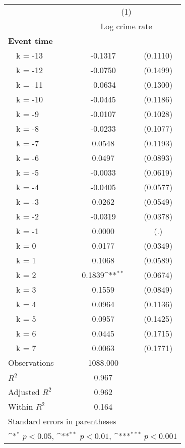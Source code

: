 {
\def\sym#1{\ifmmode^{#1}\else\(^{#1}\)\fi}
\begin{tabular}{l*{1}{cc}}
\toprule
                &\multicolumn{2}{c}{(1)}     \\
                &\multicolumn{2}{c}{Log crime rate}\\
\midrule
\textbf{Event time}&                  &         \\
~~k = -13       &  -0.1317         & (0.1110)\\
~~k = -12       &  -0.0750         & (0.1499)\\
~~k = -11       &  -0.0634         & (0.1300)\\
~~k = -10       &  -0.0445         & (0.1186)\\
~~k = -9        &  -0.0107         & (0.1028)\\
~~k = -8        &  -0.0233         & (0.1077)\\
~~k = -7        &   0.0548         & (0.1193)\\
~~k = -6        &   0.0497         & (0.0893)\\
~~k = -5        &  -0.0033         & (0.0619)\\
~~k = -4        &  -0.0405         & (0.0577)\\
~~k = -3        &   0.0262         & (0.0549)\\
~~k = -2        &  -0.0319         & (0.0378)\\
~~k = -1        &   0.0000         &      (.)\\
~~k = 0         &   0.0177         & (0.0349)\\
~~k = 1         &   0.1068         & (0.0589)\\
~~k = 2         &   0.1839\sym{**} & (0.0674)\\
~~k = 3         &   0.1559         & (0.0849)\\
~~k = 4         &   0.0964         & (0.1136)\\
~~k = 5         &   0.0957         & (0.1425)\\
~~k = 6         &   0.0445         & (0.1715)\\
~~k = 7         &   0.0063         & (0.1771)\\
\midrule
Observations    & 1088.000         &         \\
\(R^{2}\)       &    0.967         &         \\
Adjusted \(R^{2}\)&    0.962         &         \\
Within \(R^{2}\)&    0.164         &         \\
\bottomrule
\multicolumn{3}{l}{\footnotesize Standard errors in parentheses}\\
\multicolumn{3}{l}{\footnotesize \sym{*} \(p<0.05\), \sym{**} \(p<0.01\), \sym{***} \(p<0.001\)}\\
\end{tabular}
}
